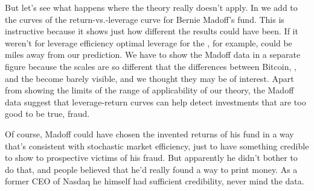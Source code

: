 But let's see what happens where the theory really doesn't apply. In  we add to the curves of  the return-vs.-leverage curve for Bernie Madoff's fund. This is instructive because it shows just how different the results could have been. If it weren't for leverage efficiency optimal leverage for the \SPT, for example, could be miles away from our prediction. We have to show the Madoff data in a separate figure 
because the scales are so different that the differences between Bitcoin, \SPT, and the \DAX become barely visible, and we thought they may be of interest.
Apart from showing the limits of the range of applicability of our theory, the Madoff data suggest that leverage-return curves can help detect investments that are too good to be true, \ie fraud. 

Of course, Madoff could have chosen the invented returns of his fund in a way that's consistent with stochastic market efficiency, just to have something credible to show to prospective victims of his fraud. But apparently he didn't bother to do that, and people believed that he'd really found a way to print money. As a former CEO of Nasdaq he himself had sufficient credibility, never mind the data.


